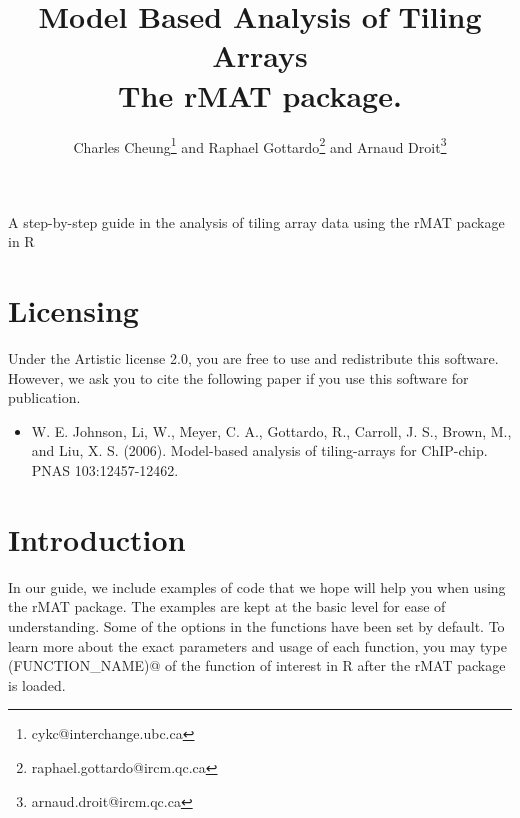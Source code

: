 \documentclass[11pt]{article}
\author{Charles Cheung\footnote{cykc@interchange.ubc.ca} and Raphael
  Gottardo\footnote{raphael.gottardo@ircm.qc.ca} and Arnaud Droit\footnote{arnaud.droit@ircm.qc.ca}}
\begin{document}
\title{Model Based Analysis of Tiling Arrays\\ The rMAT package.}
\maketitle



\textnormal {\normalfont}
A step-by-step guide in the analysis of tiling array data using the rMAT package in R

\tableofcontents
\newpage


\part{Licensing}

Under the Artistic license 2.0, you are free to use and redistribute this software. However, we ask you to cite the following paper if you use this software for publication. 

\begin{itemize}
\item[]W. E. Johnson, Li, W., Meyer, C. A., Gottardo, R., Carroll, J. S., Brown, M., and Liu, X. S. (2006). Model-based analysis of tiling-arrays for ChIP-chip. PNAS 103:12457-12462.
\end{itemize}

\part{Introduction}
In our guide, we include examples of code that we hope will help you when using the rMAT package. The examples are kept at the basic level for ease of understanding. Some of the options in the functions have been set by default. To learn more about the exact parameters and usage of each function, you may type \verb@help(FUNCTION_NAME)@ of the function of interest in R after the rMAT package is loaded.
\newline
\end{document}
